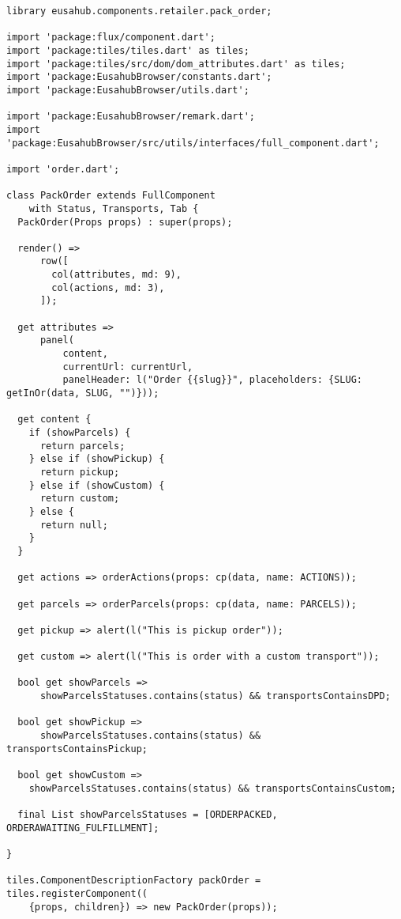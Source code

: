 \begin{lstlisting}[caption=Komponent v jazyku Dart s Flux-om, label={lst:dartComponent}]
library eusahub.components.retailer.pack_order;

import 'package:flux/component.dart';
import 'package:tiles/tiles.dart' as tiles;
import 'package:tiles/src/dom/dom_attributes.dart' as tiles;
import 'package:EusahubBrowser/constants.dart';
import 'package:EusahubBrowser/utils.dart';

import 'package:EusahubBrowser/remark.dart';
import 'package:EusahubBrowser/src/utils/interfaces/full_component.dart';

import 'order.dart';

class PackOrder extends FullComponent
    with Status, Transports, Tab {
  PackOrder(Props props) : super(props);

  render() =>
      row([
        col(attributes, md: 9),
        col(actions, md: 3),
      ]);

  get attributes =>
      panel(
          content,
          currentUrl: currentUrl,
          panelHeader: l("Order {{slug}}", placeholders: {SLUG: getInOr(data, SLUG, "")}));

  get content {
    if (showParcels) {
      return parcels;
    } else if (showPickup) {
      return pickup;
    } else if (showCustom) {
      return custom;
    } else {
      return null;
    }
  }

  get actions => orderActions(props: cp(data, name: ACTIONS));

  get parcels => orderParcels(props: cp(data, name: PARCELS));

  get pickup => alert(l("This is pickup order"));

  get custom => alert(l("This is order with a custom transport"));

  bool get showParcels =>
      showParcelsStatuses.contains(status) && transportsContainsDPD;

  bool get showPickup =>
      showParcelsStatuses.contains(status) && transportsContainsPickup;

  bool get showCustom =>
    showParcelsStatuses.contains(status) && transportsContainsCustom;

  final List showParcelsStatuses = [ORDERPACKED, ORDERAWAITING_FULFILLMENT];

}

tiles.ComponentDescriptionFactory packOrder = tiles.registerComponent((
    {props, children}) => new PackOrder(props));

\end{lstlisting}

